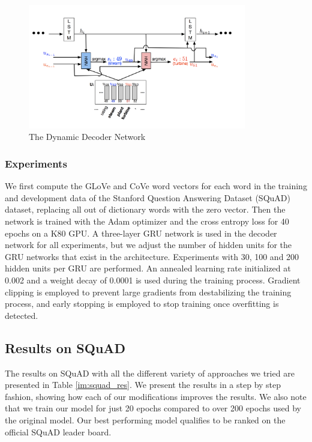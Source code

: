 \begin{figure}[h]
    \centering
    \includegraphics[width=0.85\textwidth]{images/decoder.png}
    \caption{The Dynamic Decoder Network}
    \label{im:dec}
\end{figure}

\subsubsection{Experiments}

We first compute the GLoVe and CoVe word vectors for each word in the training and development data of the Stanford Question Answering Dataset (SQuAD) dataset, replacing all out of dictionary words with the zero vector. Then the network is trained with the Adam optimizer and the cross entropy loss for 40 epochs on a K80 GPU. A three-layer GRU network is used in the decoder network for all experiments, but we adjust the number of hidden units for the GRU networks that exist in the architecture. Experiments with 30, 100 and 200 hidden units per GRU are performed. An annealed learning rate initialized at 0.002 and a weight decay of 0.0001 is used during the training process. Gradient clipping is employed to prevent large gradients from destabilizing the training process, and early stopping is employed to stop training once overfitting is detected.

\subsection{Results on SQuAD}
The results on SQuAD with all the different variety of approaches we tried are presented in Table \ref{im:squad_res}. We present the results in a step by step fashion, showing how each of our modifications improves the results. We also note that we train our model for just 20 epochs compared to over 200 epochs used by the original model. Our best performing model qualifies to be ranked on the official SQuAD leader board.

